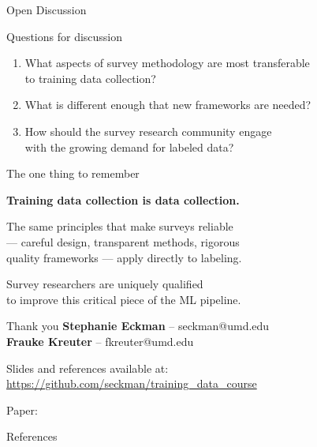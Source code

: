 \documentclass[aspectratio=169,11pt]{beamer}
\begin{document}
\begin{frame}[standout]
Open Discussion
\end{frame}

\begin{frame}{Questions for discussion}

\begin{enumerate}
  \item What aspects of survey methodology are most transferable\\
        to training data collection?

  \vspace{0.8em}

  \item What is different enough that new frameworks are needed?

  \vspace{0.8em}

  \item How should the survey research community engage\\
        with the growing demand for labeled data?
\end{enumerate}
\end{frame}

\begin{frame}{The one thing to remember}

\vspace{1em}

\textbf{Training data collection is data collection.}

\vspace{1em}

The same principles that make surveys reliable\\
--- careful design, transparent methods, rigorous\\
quality frameworks --- apply directly to labeling.

\vspace{1.5em}

Survey researchers are uniquely qualified\\
to improve this critical piece of the ML pipeline.
\end{frame}

\begin{frame}{Thank you}
\textbf{Stephanie Eckman} -- seckman@umd.edu\\
\textbf{Frauke Kreuter} -- fkreuter@umd.edu

\vspace{2em}

Slides and references available at:\\
\url{https://github.com/seckman/training_data_course}

\vspace{1em}

\small Paper: \citet{eckman2024position}
\end{frame}

\begin{frame}[allowframebreaks]{References}
\small

\end{frame}
\end{document}
